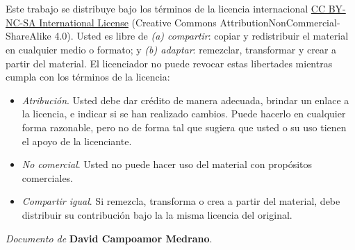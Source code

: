\

\

\noindent
Este trabajo se distribuye bajo los términos de la licencia internacional \href{http://creativecommons.org/licenses/by-nc-sa/4.0/}{CC BY-NC-SA International License} (Creative Commons AttributionNonCommercial-ShareAlike 4.0). Usted es libre de \textit{(a) compartir}: copiar y redistribuir el material en cualquier medio o formato; y \textit{(b) adaptar}: remezclar, transformar y crear a partir del material. El licenciador no puede revocar estas libertades mientras cumpla con los términos de la licencia:

\begin{itemize}
\item \textit{Atribución}. Usted debe dar crédito de manera adecuada, brindar un enlace a la licencia, e indicar si se han realizado cambios. Puede hacerlo en cualquier forma razonable, pero no de forma tal que sugiera que usted o su uso tienen el apoyo de la licenciante.
\item \textit{No comercial}. Usted no puede hacer uso del material con propósitos comerciales.
\item \textit{Compartir igual}. Si remezcla, transforma o crea a partir del material, debe distribuir su contribución bajo la la misma licencia del original.
\end{itemize}

\begin{flushright}
		\vspace{7.0 cm}
		\emph{Documento de} \textbf{David Campoamor Medrano}. %
\end{flushright}

